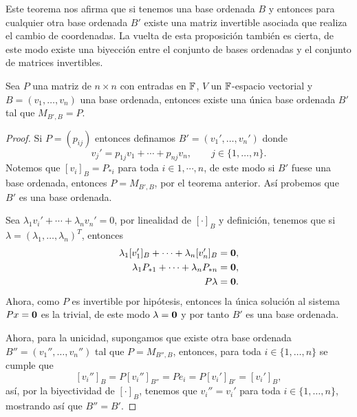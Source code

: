Este teorema nos afirma que si tenemos una base ordenada $B$ y entonces para cualquier otra base ordenada $B'$ existe una matriz invertible asociada que realiza el cambio de coordenadas. La vuelta de esta proposición también es cierta, de este modo existe una biyección entre el conjunto de bases ordenadas y el conjunto de matrices invertibles.

\begin{prop}
  Sea $P$ una matriz de $n\times n$ con entradas en $\mathbb{F}$, $V$ un $\mathbb{F}$-espacio vectorial y $B = (v_1, \ldots, v_n)$ una base ordenada, entonces existe una única base ordenada $B'$ tal que $M_{B',B} = P$.
\end{prop}
\begin{proof}
  Si $P = (p_{ij})$ entonces definamos $B' = (v_1', \ldots, v_n')$ donde
    \[ v_j' = p_{1j}v_1 + \cdots +  p_{nj}v_n,     \qquad j \in \{1,\ldots, n\}. \]
  Notemos que $[v_i]_B = P_{*i}$ para toda $i \in 1,\cdots,n$, de este modo si $B'$ fuese una base ordenada, entonces $P = M_{B',B}$, por el teorema anterior. Así probemos que $B'$ es una base ordenada.

  Sea $\lambda_1 v_i' + \cdots + \lambda_n v_n' = 0$, por linealidad de $[\cdot]_B$ y definición, tenemos que si $\lambda = (\lambda_1, \ldots, \lambda_n)^T$, entonces
  \begin{align*}
    \lambda_1 [v_1']_B + \cdots + \lambda_n [v_n']_B &= \mathbf{0} ,\\
    \lambda_1 P_{*1} + \cdots + \lambda_n P_{*n} &= \mathbf{0} ,\\
    P\lambda &= \mathbf{0}.
  \end{align*}
  Ahora, como $P$ es invertible por hipótesis, entonces la única solución al sistema $Px = \mathbf{0}$ es la trivial, de este modo $\lambda = \mathbf{0}$ y por tanto $B'$ es una base ordenada.

  Ahora, para la unicidad, supongamos que existe otra base ordenada $B'' = (v_1'', \ldots, v_n'')$ tal que $P = M_{B'',B}$, entonces, para toda $i \in \{1,\ldots,n\}$ se cumple que
  \[ [v_i'']_B =  P[v_i'']_{B''} = Pe_i = P[v_i']_{B'} = [v_i']_B, \]
  así, por la biyectividad de $[\cdot]_B$, tenemos que $v_i'' = v_i'$ para toda $i \in \{1,\ldots,n\}$, mostrando así que $B'' = B'$.
\end{proof}
